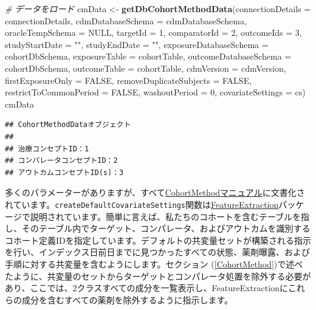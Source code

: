 \documentclass[
  11pt]{book}
\newenvironment{Shaded}{\begin{snugshade}}{\end{snugshade}}
\newcommand{\AttributeTok}[1]{\textcolor[rgb]{0.13,0.29,0.53}{#1}}
\newcommand{\CommentTok}[1]{\textcolor[rgb]{0.56,0.35,0.01}{\textit{#1}}}
\newcommand{\ConstantTok}[1]{\textcolor[rgb]{0.56,0.35,0.01}{#1}}
\newcommand{\DecValTok}[1]{\textcolor[rgb]{0.00,0.00,0.81}{#1}}
\newcommand{\FunctionTok}[1]{\textcolor[rgb]{0.13,0.29,0.53}{\textbf{#1}}}
\newcommand{\NormalTok}[1]{#1}
\newcommand{\OtherTok}[1]{\textcolor[rgb]{0.56,0.35,0.01}{#1}}
\newcommand{\StringTok}[1]{\textcolor[rgb]{0.31,0.60,0.02}{#1}}
\theoremstyle{definition}
\theoremstyle{definition}
\theoremstyle{definition}
\theoremstyle{definition}
\theoremstyle{remark}
\begin{document}
\begin{Shaded}
\begin{Highlighting}[]
\CommentTok{\# データをロード}
\NormalTok{cmData }\OtherTok{\textless{}{-}} \FunctionTok{getDbCohortMethodData}\NormalTok{(}\AttributeTok{connectionDetails =}\NormalTok{ connectionDetails,}
                                \AttributeTok{cdmDatabaseSchema =}\NormalTok{ cdmDatabaseSchema,}
                                \AttributeTok{oracleTempSchema =} \ConstantTok{NULL}\NormalTok{,}
                                \AttributeTok{targetId =} \DecValTok{1}\NormalTok{,}
                                \AttributeTok{comparatorId =} \DecValTok{2}\NormalTok{,}
                                \AttributeTok{outcomeIds =} \DecValTok{3}\NormalTok{,}
                                \AttributeTok{studyStartDate =} \StringTok{""}\NormalTok{,}
                                \AttributeTok{studyEndDate =} \StringTok{""}\NormalTok{,}
                                \AttributeTok{exposureDatabaseSchema =}\NormalTok{ cohortDbSchema,}
                                \AttributeTok{exposureTable =}\NormalTok{ cohortTable,}
                                \AttributeTok{outcomeDatabaseSchema =}\NormalTok{ cohortDbSchema,}
                                \AttributeTok{outcomeTable =}\NormalTok{ cohortTable,}
                                \AttributeTok{cdmVersion =}\NormalTok{ cdmVersion,}
                                \AttributeTok{firstExposureOnly =} \ConstantTok{FALSE}\NormalTok{,}
                                \AttributeTok{removeDuplicateSubjects =} \ConstantTok{FALSE}\NormalTok{,}
                                \AttributeTok{restrictToCommonPeriod =} \ConstantTok{FALSE}\NormalTok{,}
                                \AttributeTok{washoutPeriod =} \DecValTok{0}\NormalTok{,}
                                \AttributeTok{covariateSettings =}\NormalTok{ cs)}
\NormalTok{cmData}
\end{Highlighting}
\end{Shaded}

\begin{verbatim}
## CohortMethodDataオブジェクト
## 
## 治療コンセプトID：1
## コンパレータコンセプトID：2
## アウトカムコンセプトID(s)：3
\end{verbatim}

多くのパラメーターがありますが、すべて\href{https://ohdsi.github.io/CohortMethod/reference/}{CohortMethodマニュアル}に文書化されています。\texttt{createDefaultCovariateSettings}関数は\href{https://ohdsi.github.io/FeatureExtraction/}{FeatureExtraction}パッケージで説明されています。簡単に言えば、私たちのコホートを含むテーブルを指し、そのテーブル内でターゲット、コンパレータ、およびアウトカムを識別するコホート定義IDを指定しています。デフォルトの共変量セットが構築される指示を行い、インデックス日前日までに見つかったすべての状態、薬剤曝露、および手順に対する共変量を含むようにします。セクション (\ref{CohortMethod})で述べたように、共変量のセットからターゲットとコンパレータ処置を除外する必要があり、ここでは、2クラスすべての成分を一覧表示し、FeatureExtractionにこれらの成分を含むすべての薬剤を除外するように指示します。
\end{document}
